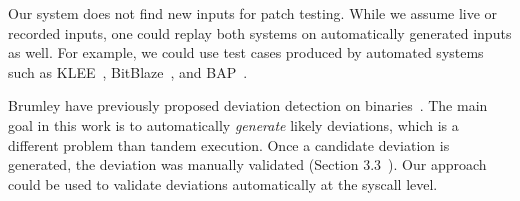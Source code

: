 Our system does not find new inputs for patch testing. While we
assume live or recorded inputs, one could replay both systems on
automatically generated inputs as well.  For example, we could use
test cases produced by automated systems such as
KLEE~\cite{cadar:2008}, BitBlaze~\cite{bitblaze}, and BAP~\cite{bap}.

Brumley \etal have previously proposed deviation detection on binaries~\cite{brumley:2007:deviations}.  The main goal in this
work is to automatically \emph{generate} likely deviations, which is a
different problem than tandem execution.  Once a candidate deviation
is generated, the deviation was manually validated (Section
3.3~\cite{brumley:2007:deviations}). Our approach could be used to
validate deviations automatically at the syscall level.





